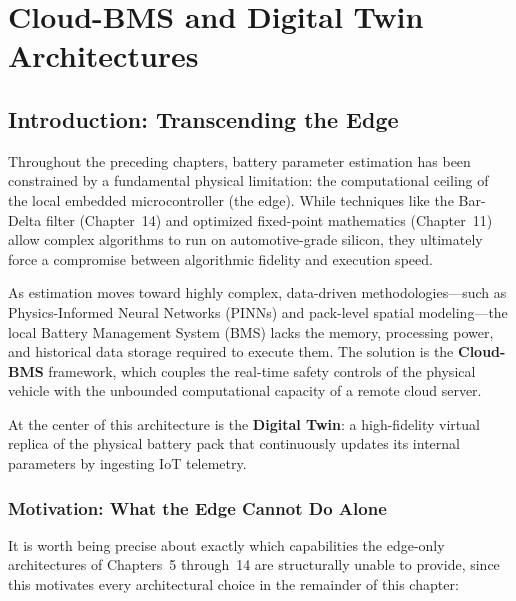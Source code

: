 
\chapter{Cloud-BMS and Digital Twin Architectures}
\label{ch:cloud_bms}

\section{Introduction: Transcending the Edge}
\label{sec:15_intro}

Throughout the preceding chapters, battery parameter estimation has been constrained by a fundamental physical limitation: the computational ceiling of the local embedded microcontroller (the edge). While techniques like the Bar-Delta filter (Chapter~14) and optimized fixed-point mathematics (Chapter~11) allow complex algorithms to run on automotive-grade silicon, they ultimately force a compromise between algorithmic fidelity and execution speed.

As estimation moves toward highly complex, data-driven methodologies—such as Physics-Informed Neural Networks (PINNs) and pack-level spatial modeling—the local Battery Management System (BMS) lacks the memory, processing power, and historical data storage required to execute them. The solution is the \textbf{Cloud-BMS} framework, which couples the real-time safety controls of the physical vehicle with the unbounded computational capacity of a remote cloud server.

At the center of this architecture is the \textbf{Digital Twin}: a high-fidelity virtual replica of the physical battery pack that continuously updates its internal parameters by ingesting IoT telemetry.

\subsection{Motivation: What the Edge Cannot Do Alone}
\label{subsec:15_motivation}

It is worth being precise about exactly which capabilities the edge-only architectures of Chapters~5 through~14 are structurally unable to provide, since this motivates every architectural choice in the remainder of this chapter:

